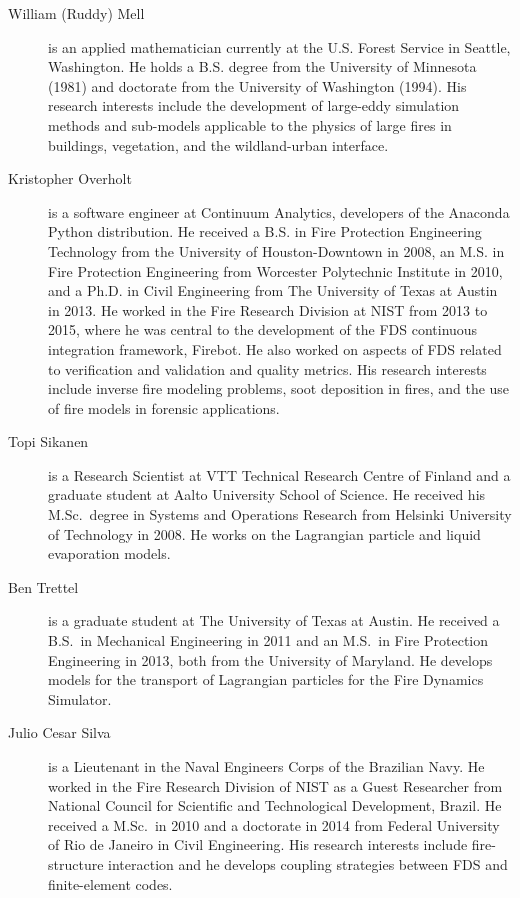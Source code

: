 \begin{description}
\item[William (Ruddy) Mell] is an applied mathematician currently at the U.S. Forest Service in Seattle, Washington. He holds a B.S. degree from the University of Minnesota (1981) and doctorate from the University of Washington (1994). His research interests include the development of large-eddy simulation methods and sub-models applicable to the physics of large fires in buildings, vegetation, and the wildland-urban interface.

\item[Kristopher Overholt] is a software engineer at Continuum Analytics, developers of the Anaconda Python distribution. He received a B.S. in Fire Protection Engineering Technology from the University of Houston-Downtown in 2008, an M.S. in Fire Protection Engineering from Worcester Polytechnic Institute in 2010, and a Ph.D. in Civil Engineering from The University of Texas at Austin in 2013. He worked in the Fire Research Division at NIST from 2013 to 2015, where he was central to the development of the FDS continuous integration framework, Firebot.  He also worked on aspects of FDS related to verification and validation and quality metrics. His research interests include inverse fire modeling problems, soot deposition in fires, and the use of fire models in forensic applications.

\item[Topi Sikanen] is a Research Scientist at VTT Technical Research Centre of Finland and a graduate student at Aalto University School of Science. He received his M.Sc.~degree in Systems and Operations Research from Helsinki University of Technology in 2008. He works on the Lagrangian particle and liquid evaporation models.

\item[Ben Trettel] is a graduate student at The University of Texas at Austin. He received a B.S.~in Mechanical Engineering in 2011 and an M.S.~in Fire Protection Engineering in 2013, both from the University of Maryland. He develops models for the transport of Lagrangian particles for the Fire Dynamics Simulator.

\item[Julio Cesar Silva] is a Lieutenant in the Naval Engineers Corps of the Brazilian Navy. He worked in the Fire Research Division of NIST as a Guest Researcher from National Council for Scientific and Technological Development, Brazil. He received a M.Sc.~in 2010 and a doctorate in 2014 from Federal University of Rio de Janeiro in Civil Engineering. His research interests include fire-structure interaction and he develops coupling strategies between FDS and finite-element codes.


\end{description}
